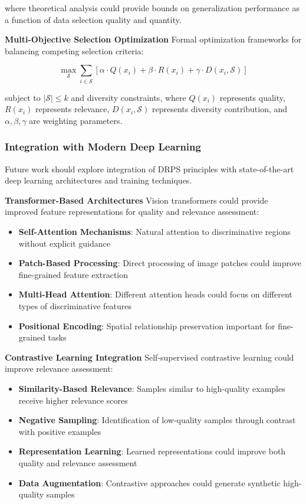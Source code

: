 \documentclass[12pt]{article}
\begin{document}
where theoretical analysis could provide bounds on generalization performance as a function of data selection quality and quantity.

\textbf{Multi-Objective Selection Optimization}
Formal optimization frameworks for balancing competing selection criteria:

\begin{equation}
\max_{\mathcal{S}} \sum_{i \in \mathcal{S}} \left[ \alpha \cdot Q(x_i) + \beta \cdot R(x_i) + \gamma \cdot D(x_i, \mathcal{S}) \right]
\end{equation}

subject to $|\mathcal{S}| \leq k$ and diversity constraints, where $Q(x_i)$ represents quality, $R(x_i)$ represents relevance, $D(x_i, \mathcal{S})$ represents diversity contribution, and $\alpha, \beta, \gamma$ are weighting parameters.

\subsubsection{Integration with Modern Deep Learning}\label{modern-integration}

Future work should explore integration of DRPS principles with state-of-the-art deep learning architectures and training techniques.

\textbf{Transformer-Based Architectures}
Vision transformers could provide improved feature representations for quality and relevance assessment:

\begin{itemize}
\item \textbf{Self-Attention Mechanisms}: Natural attention to discriminative regions without explicit guidance
\item \textbf{Patch-Based Processing}: Direct processing of image patches could improve fine-grained feature extraction
\item \textbf{Multi-Head Attention}: Different attention heads could focus on different types of discriminative features
\item \textbf{Positional Encoding}: Spatial relationship preservation important for fine-grained tasks
\end{itemize}

\textbf{Contrastive Learning Integration}
Self-supervised contrastive learning could improve relevance assessment:

\begin{itemize}
\item \textbf{Similarity-Based Relevance}: Samples similar to high-quality examples receive higher relevance scores
\item \textbf{Negative Sampling}: Identification of low-quality samples through contrast with positive examples
\item \textbf{Representation Learning}: Learned representations could improve both quality and relevance assessment
\item \textbf{Data Augmentation}: Contrastive approaches could generate synthetic high-quality samples
\end{itemize}
\end{document}
